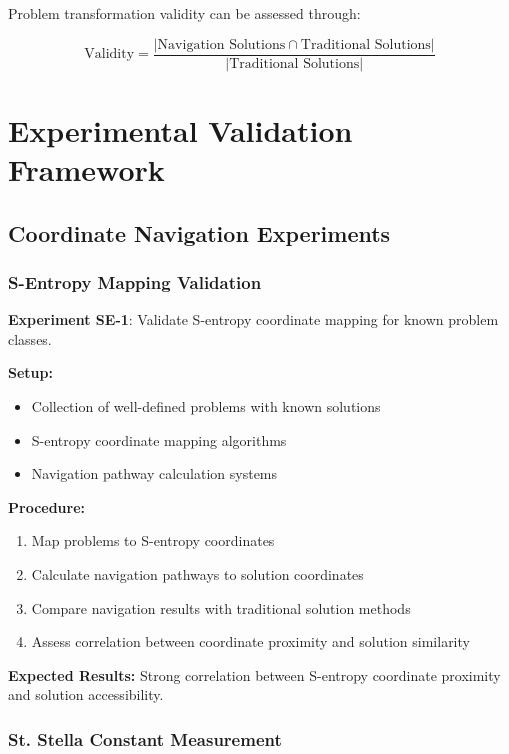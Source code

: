 \documentclass[11pt]{article}
\begin{document}
Problem transformation validity can be assessed through:

\begin{equation}
\text{Validity} = \frac{|\text{Navigation Solutions} \cap \text{Traditional Solutions}|}{|\text{Traditional Solutions}|}
\label{eq:transformation_validity}
\end{equation}

\section{Experimental Validation Framework}

\subsection{Coordinate Navigation Experiments}

\subsubsection{S-Entropy Mapping Validation}

\textbf{Experiment SE-1}: Validate S-entropy coordinate mapping for known problem classes.

\textbf{Setup:}
\begin{itemize}
\item Collection of well-defined problems with known solutions
\item S-entropy coordinate mapping algorithms
\item Navigation pathway calculation systems
\end{itemize}

\textbf{Procedure:}
\begin{enumerate}
\item Map problems to S-entropy coordinates
\item Calculate navigation pathways to solution coordinates
\item Compare navigation results with traditional solution methods
\item Assess correlation between coordinate proximity and solution similarity
\end{enumerate}

\textbf{Expected Results:} Strong correlation between S-entropy coordinate proximity and solution accessibility.

\subsubsection{St. Stella Constant Measurement}
\end{document}
